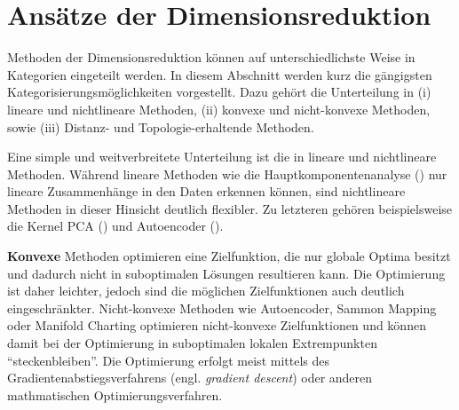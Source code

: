 \section{Ansätze der Dimensionsreduktion}
\label{ch:Dimensionsreduktion:Ansaetze}
Methoden der Dimensionsreduktion können auf unterschiedlichste Weise in Kategorien eingeteilt werden. In diesem Abschnitt werden kurz die gängigsten Kategorisierungsmöglichkeiten vorgestellt. Dazu gehört die Unterteilung in (i) lineare und nichtlineare Methoden, (ii) konvexe und nicht-konvexe Methoden, sowie (iii) Distanz- und Topologie-erhaltende Methoden.

Eine simple und weitverbreitete Unterteilung ist die in lineare und nichtlineare Methoden. Während
lineare Methoden wie die Hauptkomponentenanalyse ()
nur lineare Zusammenhänge in den Daten erkennen können, sind nichtlineare Methoden in dieser
Hinsicht deutlich flexibler. Zu letzteren gehören beispielsweise die Kernel PCA
() und Autoencoder
().

\textbf{Konvexe} Methoden optimieren eine Zielfunktion, die nur globale Optima besitzt und dadurch nicht in suboptimalen Lösungen resultieren kann. Die Optimierung ist daher leichter, jedoch sind die möglichen Zielfunktionen auch deutlich eingeschränkter. Nicht-konvexe Methoden wie Autoencoder, Sammon Mapping oder Manifold Charting optimieren nicht-konvexe Zielfunktionen und können damit bei der Optimierung in suboptimalen lokalen Extrempunkten \enquote{steckenbleiben}. Die Optimierung erfolgt meist mittels des Gradientenabstiegsverfahrens (engl. \textit{gradient descent}) oder anderen mathmatischen Optimierungsverfahren.\addref

